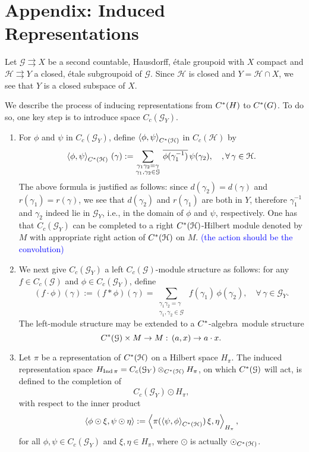 \documentclass[a4paper]{amsart}
\newcommand\blue[1]{\textcolor{blue}{#1}}
\newcommand{\Ind}{\operatorname{Ind}}
\newcommand{\tto}{\rightrightarrows}
\newcommand\Cstar{C\sp{\ast}}
\newcommand\Cstara{$\Cstar$-algebra}
\newcommand{\maG}{\mathcal G}
\newcommand{\maH}{\mathcal H}
\newcommand\<{\langle}
\renewcommand\>{\rangle}
\theoremstyle{definition}
\theoremstyle{remark}
\begin{document}
\bigskip
\section{Appendix: Induced Representations}

Let $\maG\tto X$ be a second countable, Hausdorff, \'etale groupoid with $X$ compact and $\maH \tto Y$ a closed, \'etale subgroupoid of $\maG$.
Since $\maH$ is closed and $Y=\maH \cap X$, we see that $Y$ is a closed subspace of $X$.

We describe the process of inducing representations from $\Cstar(H)$ to $\Cstar(G)$. To do so, one key step is to introduce space $C_c(\maG_Y)$.
\begin{enumerate}
\item[\text{Step 1:}]
For $\phi$ and $\psi$ in $C_c(\maG_Y)$, define $\left\langle \phi, \psi \right \rangle_{\Cstar(\maH)}$ in $C_c(\maH)$ by
\begin{equation*}
\left\langle \phi, \psi \right \rangle_{\Cstar(\maH)} \, (\gamma):= \sum_{\substack{\gamma_1\gamma_2=\gamma \\ \gamma_1,\gamma_2 \in \maG}} \,
\overline{\phi(\gamma_1^{-1})} \,\psi(\gamma_2), \quad, \forall\, \gamma\in \maH.
\end{equation*}
The above formula is justified as follows: since $d(\gamma_2)=d(\gamma)$ and $r(\gamma_1)=r(\gamma)$, we see that $d(\gamma_2)$ and $r(\gamma_1)$
are both in $Y$, therefore $\gamma_1^{-1}$ and $\gamma_2$ indeed lie in $\maG_Y$, i.e., in the domain of $\phi$ and $\psi$, respectively. One has that $C_c(\maG_Y)$ can be completed to a right $\Cstar(\maH)$-Hilbert module denoted by $M$ with appropriate right action of $\Cstar(\maH)$ on $M$. \blue{(the action should be the convolution)}

\item[\text{Step 2:}]
We next give $C_c(\maG_Y)$ a left $C_c(\maG)$-module structure as follows: for any $f \in C_c(\maG)$ and $\phi \in C_c(\maG_Y)$, define
\begin{equation*}
(f\cdot \phi)(\gamma):=(f * \phi)(\gamma)= \sum_{\substack{\gamma_1\gamma_2=\gamma \\ \gamma_1,\gamma_2 \in \maG}} \,f(\gamma_1) \, \phi(\gamma_2), \quad \forall \, \gamma\in \maG_Y.
\end{equation*}
The left-module structure may be extended to a \Cstara \, module structure
$$\Cstar(\maG) \times M \rightarrow M: \, (a, x)\rightarrow a\cdot x.$$

\item[\text{Step 3:}]
Let $\pi$ be a representation of $\Cstar(\maH)$ on a Hilbert space $H_{\pi}$. The induced representation space $H_{\Ind \pi}= C_c(\maG_Y)\otimes_{\Cstar(\maH)} H_{\pi}$, on which
 $\Cstar(\maG)$ will act, is defined to the completion of
 $$ C_c(\maG_Y) \odot H_\pi,$$
with respect to the inner product
$$\left \langle \phi\odot \xi, \psi \odot \eta \right\rangle := \left\langle \pi (\left\langle \psi, \phi \right\rangle_{\Cstar(\maH)}) \, \xi, \eta \right\rangle_{H_\pi},$$
for all $ \phi, \psi \in C_c(\maG_Y)$ and $ \xi,\eta \in H_{\pi}$, where $\odot$ is actually $\odot_{\Cstar(\maH)}$.


\end{enumerate}
\end{document}
